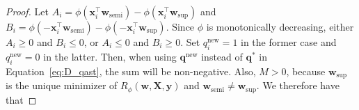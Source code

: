 \documentclass[twoside]{memoir}\usepackage[]{graphicx}\usepackage{xcolor}
\begin{document}
\begin{proof}
Let $A_i = \phi(\mathbf{x}_i^\top \mathbf{w}_\mathrm{semi})- \phi(\mathbf{x}_i^\top \mathbf{w}_\mathrm{sup})$ and $B_i = \phi(-\mathbf{x}_i^\top \mathbf{w}_\mathrm{semi})- \phi(-\mathbf{x}_i^\top \mathbf{w}_\mathrm{sup})$. Since $\phi$ is monotonically decreasing, either $A_i \geq 0$ and $B_i \leq 0$, or $A_i \leq 0$ and $B_i \geq 0$. Set $q^\mathrm{new}_i=1$ in the former case and $q^\mathrm{new}_i=0$ in the latter. Then, when using $\mathbf{q}^\mathrm{new}$ instead of $\mathbf{q}^\ast$ in Equation~\eqref{eq:D_qast}, the sum will be non-negative. Also, $M > 0$, because $\mathbf{w}_\mathrm{sup}$ is the unique minimizer of ${R}_\phi(\mathbf{w},\mathbf{X},\mathbf{y})$ and $\mathbf{w}_\mathrm{semi} \neq \mathbf{w}_\mathrm{sup}$. We therefore have that 

\end{proof}
\end{document}
